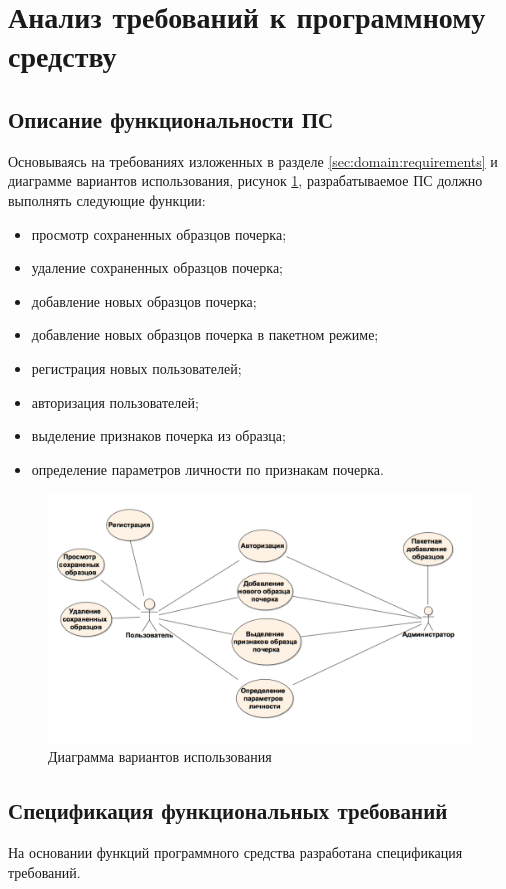 \section{Анализ требований к программному средству}
\label{sec:freq}
\subsection{Описание функциональности ПС}
Основываясь на требованиях изложенных в разделе \ref{sec:domain:requirements} и диаграмме вариантов использования, рисунок \ref{fig:freg:usecase}, разрабатываемое ПС должно выполнять следующие функции:
\begin{itemize}
	\item просмотр сохраненных образцов почерка;
	\item удаление сохраненных образцов почерка;
	\item добавление новых образцов почерка;
	\item добавление новых образцов почерка в пакетном режиме;
	\item регистрация новых пользователей;
	\item авторизация пользователей;
	\item выделение признаков почерка из образца;
	\item определение параметров личности по признакам почерка.
\end{itemize}

\begin{figure}[ht]
\centering
    \includegraphics[scale=0.4]{figures/use_case.png}  
    \caption{Диаграмма вариантов использования}
  \label{fig:freg:usecase}
\end{figure}

\subsection{Спецификация функциональных требований}
На основании функций программного средства разработана спецификация требований. 
